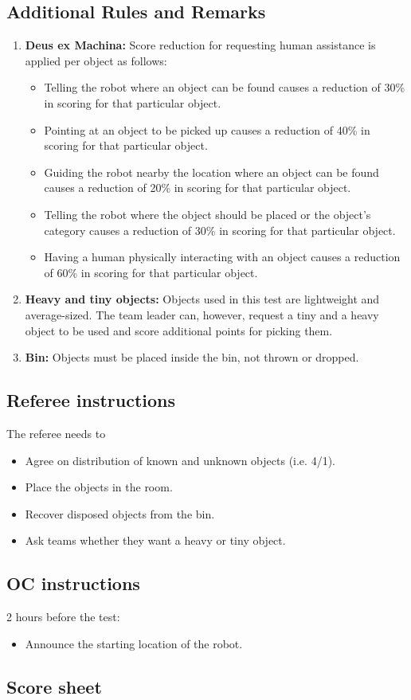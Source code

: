 \subsection{Additional Rules and Remarks}
\begin{enumerate}[nosep]
	\item \textbf{Deus ex Machina:} Score reduction for requesting human assistance is applied per object as follows:
	\begin{itemize}[nosep]
		\item Telling the robot where an object can be found causes a reduction of 30\% in scoring for that particular object.

		\item Pointing at an object to be picked up causes a reduction of 40\% in scoring for that particular object.
		
		\item Guiding the robot nearby the location where an object can be found causes a reduction of 20\% in scoring for that particular object.

		\item Telling the robot where the object should be placed or the object's category causes a reduction of 30\% in scoring for that particular object.

		\item Having a human physically interacting with an object causes a reduction of 60\% in scoring for that particular object.
	\end{itemize}
	
	\item \textbf{Heavy and tiny objects:} Objects used in this test are lightweight and average-sized.
	The team leader can, however, request a tiny and a heavy object to be used and score additional points for picking them.
	
	\item \textbf{Bin:} Objects must be placed inside the bin, not thrown or dropped.
\end{enumerate}

\subsection{Referee instructions}
The referee needs to
\begin{itemize}
	\item Agree on distribution of known and unknown objects (i.e. 4/1). 
	\item Place the objects in the room.
	\item Recover disposed objects from the bin.
	\item Ask teams whether they want a heavy or tiny object.
\end{itemize}

\subsection{OC instructions}
2 hours before the test:
\begin{itemize}
	\item Announce the starting location of the robot.
\end{itemize}

\newpage
\subsection{Score sheet}
